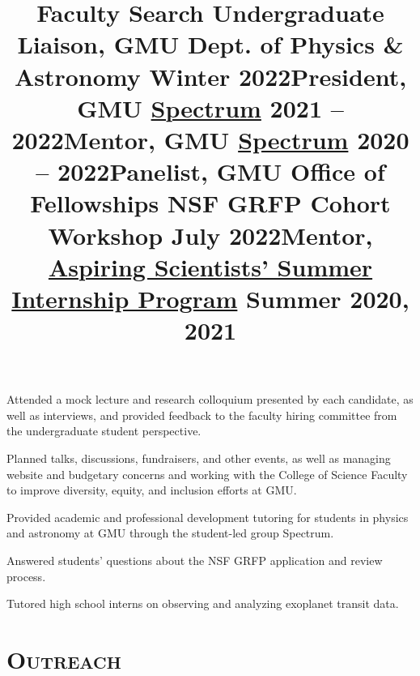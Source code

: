 \documentclass[marg, centered]{res}
\begin{document}
\begin{resume}
\vspace{-0.2cm}
\title{\textbf{Faculty Search Undergraduate Liaison}, GMU Dept. of Physics \& Astronomy \hfill \textbf{Winter 2022}}
\begin{position}
{\small Attended a mock lecture and research colloquium presented by each candidate, as well as interviews, and provided feedback to the faculty hiring committee from the undergraduate student perspective.}
\end{position}

\vspace{-0.2cm}
\title{\textbf{President}, GMU \href{https://gmuspectrum.squarespace.com/}{\color{dkbu} Spectrum} \hfill \textbf{2021 -- 2022}}
\begin{position}
{\small Planned talks, discussions, fundraisers, and other events, as well as managing website and budgetary concerns and working with the College of Science Faculty to improve diversity, equity, and inclusion efforts at GMU.}
\end{position}

\vspace{-0.2cm}
\title{\textbf{Mentor}, GMU \href{https://gmuspectrum.squarespace.com/}{\color{dkbu} Spectrum} \hfill \textbf{2020 -- 2022}}
\begin{position}
{\small Provided academic and professional development tutoring for students in physics and astronomy at GMU through the student-led group Spectrum.}
\end{position}

\vspace{-0.2cm}
\title{\textbf{Panelist}, GMU Office of Fellowships NSF GRFP Cohort Workshop \hfill \textbf{July 2022}}
\begin{position}
{\small Answered students' questions about the NSF GRFP application and review process.}
\end{position}

\vspace{-0.2cm}
\title{\textbf{Mentor}, \href{https://science.gmu.edu/assip}{\color{dkbu} Aspiring Scientists' Summer Internship Program} \hfill \textbf{Summer 2020, 2021}}
\begin{position}
{\small Tutored high school interns on observing and analyzing exoplanet transit data.}
\end{position}

\section{{\scshape \bfseries Outreach}}


\end{resume}
\end{document}
